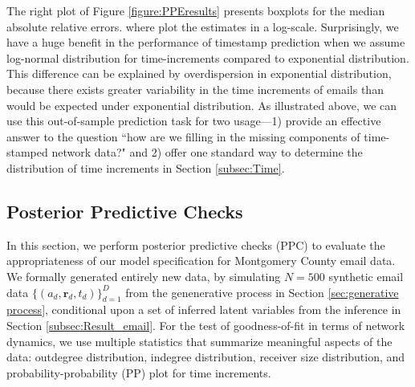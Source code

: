 \documentclass[ba]{imsart}
\def\spacingset#1{\renewcommand{\baselinestretch}%
	{#1}\small\normalsize} \spacingset{1}
\numberwithin{equation}{section}
\theoremstyle{plain}
\begin{document}
	The right plot of Figure \ref{figure:PPEresults} presents boxplots for the median absolute relative errors. where plot the estimates in a log-scale. Surprisingly, we have a huge benefit in the performance of timestamp prediction when we assume log-normal distribution for time-increments compared to exponential distribution. This difference can be explained by overdispersion in exponential distribution, because there exists greater variability in the time increments of emails than would be expected under exponential distribution. As illustrated above, we can use this out-of-sample prediction task for two usage---1) provide an effective answer to the question ``how are we filling in the missing components of time-stamped network data?" and 2) offer one standard way to determine the distribution of time increments in Section \ref{subsec:Time}. 

	\subsection{Posterior Predictive Checks}\label{subsec:PPC_email} 	   
In this section, we perform posterior predictive checks (PPC) \citep{rubin1984bayesianly} to evaluate the appropriateness of our model specification for Montgomery County email data. We formally generated entirely new data, by simulating $N=500$ synthetic email data $\{(a_{d}, \boldsymbol{r}_{d}, t_{d})\}_{d=1}^D$ from the genenerative process in Section \ref{sec:generative process}, conditional upon a set of inferred latent variables from the inference in Section \ref{subsec:Result_email}. For the test of goodness-of-fit in terms of network dynamics, we use multiple statistics that summarize meaningful aspects of the data: outdegree distribution, indegree distribution, receiver size distribution, and probability-probability (PP) plot for time increments. 

		
\end{document}
